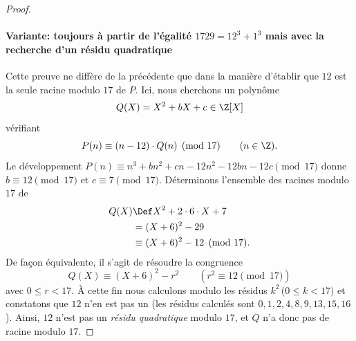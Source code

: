 \begin{proof}
\paragraph{Variante: toujours à partir de l'égalité $1729 = 12^3 + 1^3$ mais avec la recherche d'un résidu quadratique} %
Cette preuve ne diffère de la précédente que dans la manière d'établir que $12$ est la seule racine modulo $17$ de $P$. Ici, %
nous cherchons un polynôme 
%
\begin{equation}
  Q(X)=X^2+ b X+ c \in \Z[X]
\end{equation}
%
vérifiant
%
\begin{equation}
  P(n) \equiv  (n-12)\cdot Q(n) \pmod{17} \qquad (n \in \Z).
\end{equation}
%
Le développement $P(n) \equiv  n^3 + b n^2 + c n - 12 n^2 - 12 bn - 12 c \pmod{17}$ donne %
$b\equiv 12 \pmod{17}$ et $c \equiv 7 \pmod{17}$. Déterminons l'ensemble des racines modulo $17$ de  
%
\begin{align}
  Q(X) &\Def  X^2 + 2\cdot 6 \cdot X + 7 \\
  &= (X + 6)^2 - 29 \\
  &\equiv (X + 6)^2 - 12 \pmod{17}.
\end{align}
%
De façon équivalente, il s'agit de résoudre la congruence
%
\begin{equation}
  Q(X) \equiv (X + 6)^2 - r^2 \qquad (r^2 \equiv 12 \pmod{17})
\end{equation}
%
avec $0\leq r < 17$. À cette fin nous calculons modulo les résidus $k^2$\;\,($0 \leq k < 17)$ et constatons que $12$ n'en %
est pas un (les résidus calculés sont $0, 1, 2, 4, 8, 9, 13, 15, 16$). Ainsi, $12$ n'est pas un \emph{résidu quadratique} %
modulo $17$, et $Q$ n'a donc pas de racine modulo $17$.
\end{proof}